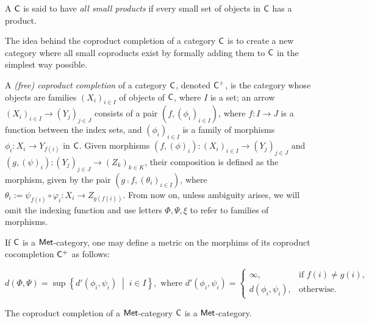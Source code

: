\begin{definition}
A \(\mathsf{C}\) is said to have \emph{all small products} if every small set of objects in \(\mathsf{C}\) has a product.
\end{definition}


The idea behind the coproduct completion of a category $\mathsf{C}$ is to create a new category where all small coproducts exist by formally adding them to $\mathsf{C}$  in the simplest way possible.

\begin{definition}
  A \emph{(free) coproduct completion} of a category \(\mathsf{C}\), denoted $\mathsf{C}^+$, is the category whose objects are families \((X_i)_{i \in I}\) of objects of \(\mathsf{C}\), where \(I\) is a set; an arrow \((X_i)_{i \in I} \to (Y_j)_{j \in J}\) consists of a pair \((f, (\phi_i)_{i \in I})\), where \(f : I \to J\) is a function between the index sets, and \((\phi_i)_{i \in I}\) is a family of morphisms \(\phi_i : X_i \to Y_{f(i)}\) in \(\mathsf{C}\). Given morphisms $(f,(\phi)_i): (X_i)_{i \in I} \to (Y_j)_{j \in J}$ and $(g,(\psi)_i): (Y_j)_{j \in J} \to (Z_k)_{k \in K}$, their composition is defined as the morphism, given by the pair \((g \comp f, (\theta_i)_{i \in I})\), where $ \theta_i := \psi_{f(i)} \circ \varphi_i : X_i \to Z_{g(f(i))}$. From now on, unless ambiguity arises, we will omit the indexing function and use letters $\Phi, \Psi, \xi$ to refer to families of morphisms.
\end{definition}


If $\mathsf{C}$ is a $\mathsf{Met}$-category, one may define a metric on the morphims of its coproduct cocompletion $\mathsf{C}^+$ as follows:

\begin{equation*}
  d(\Phi, \Psi) = \sup \left\{ d'(\phi_i, \psi_i) \;\middle\vert\; i \in I \right\},\text{ where } 
  d'(\phi_i, \psi_i) 
  = 
  \begin{cases}
    \infty, & \text{if } f(i) \neq g(i), \\
    d(\phi_i, \psi_i), & \text{otherwise}.
  \end{cases}
\end{equation*}

\begin{proposition} \label{prop:cop_completion_met}
  The coproduct completion of a $\mathsf{Met}$-category $\mathsf{C}$ is a $\mathsf{Met}$-category.
\end{proposition}


